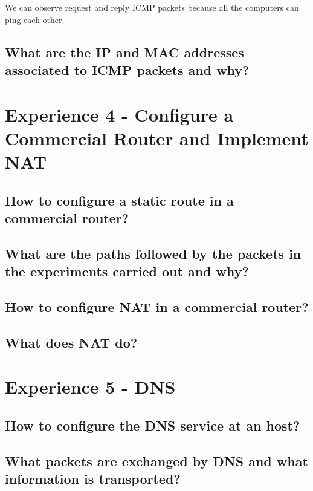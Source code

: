 \documentclass[11pt]{report}
\begin{document}
We can observe request and reply ICMP packets because all the computers can ping each other.

\subsection{What are the IP and MAC addresses associated to ICMP packets and
why?}

\newpage

\section{Experience 4 - Configure a Commercial Router and Implement NAT}

\subsection{How to configure a static route in a commercial router?}

\subsection{What are the paths followed by the packets in the experiments carried out and why?}

\subsection{How to configure NAT in a commercial router?}

\subsection{What does NAT do?}

\newpage

\section{Experience 5 - DNS}

\subsection{How to configure the DNS service at an host?}

\subsection{What packets are exchanged by DNS and what information is transported?}
\end{document}

